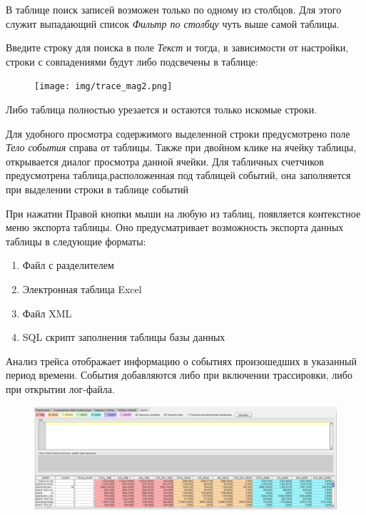 
В таблице поиск записей возможен только по одному из столбцов. Для этого служит выпадающий список \textit{Фильтр по столбцу} чуть выше самой таблицы. 

Введите строку для поиска в поле \textit{Текст} и тогда, в зависимости от настройки, строки с совпадениями будут либо подсвечены в таблице:
\begin{figure}[H]
	\centering
	\texttt{[image: img/trace\_mag2.png]}
\end{figure}
\noindent Либо таблица полностью урезается и остаются только искомые строки.


Для удобного просмотра содержимого выделенной строки предусмотрено поле \textit{Тело события} справа от таблицы. Также при двойном клике на ячейку таблицы, открывается диалог просмотра данной ячейки. Для табличных счетчиков предусмотрена таблица,расположенная под таблицей событий, она заполняется при выделении строки в таблице событий

При нажатии Правой кнопки мыши на любую из таблиц, появляется контекстное меню экспорта таблицы. Оно предусматривает возможность экспорта данных таблицы в следующие форматы:
\begin{enumerate}[leftmargin=20pt]
	\item Файл с разделителем
	\item Электронная таблица Excel
	\item Файл XML
	\item SQL скрипт заполнения таблицы базы данных
\end{enumerate}
	

Анализ трейса отображает информацию о событиях произошедших в указанный период времени. События добавляются либо при включении трассировки, либо при открытии лог-файла.

\begin{figure}[H]
	\centering
	\includegraphics[width = 1\linewidth]{img/trace_analysis.png}
\end{figure}

